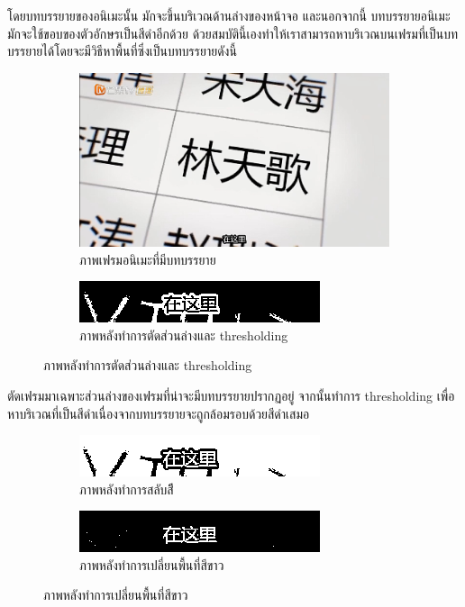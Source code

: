 \documentclass[hidelinks,a4paper,14pt]{article}
\numberwithin{equation}{section}							%
\begin{document}
{		โดยบทบรรยายของอนิเมะนั้น มักจะขึ้นบริเวณด้านล่างของหน้าจอ และนอกจากนี้ บทบรรยายอนิเมะมักจะใช้ขอบของตัวอักษรเป็นสีดำอีกด้วย ด้วยสมบัตินี้เองทำให้เราสามารถหาบริเวณบนเฟรมที่เป็นบทบรรยายได้โดยจะมีวิธีหาพื้นที่ซึ่งเป็นบทบรรยายดังนี้
		
		\begin{figure}[H]
			\begin{subfigure}{0.4\linewidth}
				\centering
				\includegraphics[width=0.4\linewidth]{images/detection-original.png}
				\caption{ภาพเฟรมอนิเมะที่มีบทบรรยาย}
			\end{subfigure}
			\begin{subfigure}{0.4\linewidth}
				\centering
				\includegraphics[width=0.4\linewidth]{images/detection-threshold.png}
				\caption{ภาพหลังทำการตัดส่วนล่างและ thresholding}
			\end{subfigure}
		\end{figure}
		
		ตัดเฟรมมาเฉพาะส่วนล่างของเฟรมที่น่าจะมีบทบรรยายปรากฏอยู่ จากนั้นทำการ thresholding เพื่อหาบริเวณที่เป็นสีดำเนื่องจากบทบรรยายจะถูกล้อมรอบด้วยสีดำเสมอ
		
		\begin{figure}[H]
			\begin{subfigure}{0.4\linewidth}
				\centering
				\includegraphics[width=0.4\linewidth]{images/detection-inverse.png}
				\caption{ภาพหลังทำการสลับสีี}
			\end{subfigure}
			\begin{subfigure}{0.4\linewidth}
				\centering
				\includegraphics[width=0.4\linewidth]{images/detection-blackfill.png}
				\caption{ภาพหลังทำการเปลี่ยนพื้นที่สีขาว}
			\end{subfigure}
		\end{figure}
		
}
\end{document}

